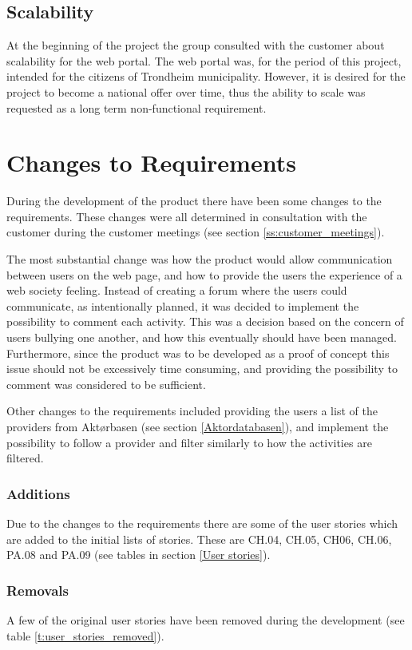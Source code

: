 \subsection{Scalability}
At the beginning of the project the group consulted with the customer about scalability for the web portal. The web portal was, for the period of this project, intended for the citizens of Trondheim municipality. However, it is desired for the project to become a national offer over time, thus the ability to scale was requested as a long term non-functional requirement.


\section{Changes to Requirements}
During the development of the product there have been some changes to the requirements. These changes were all determined in consultation with the customer during the customer meetings (see section \ref{ss:customer_meetings}). 

The most substantial change was how the product would allow communication between users on the web page, and how to provide the users the experience of a web society feeling. Instead of creating a forum where the users could communicate, as intentionally planned, it was decided to implement the possibility to comment each activity. This was a decision based on the concern of users bullying one another, and how this eventually should have been managed. Furthermore, since the product was to be developed as a proof of concept this issue should not be excessively time consuming, and providing the possibility to comment was considered to be sufficient. 

Other changes to the requirements included providing the users a list of the providers from Aktørbasen (see section \ref{Aktordatabasen}), and implement the possibility to follow a provider and filter similarly to how the activities are filtered.  

\subsubsection{Additions}
\label{additions}
Due to the changes to the requirements there are some of the user stories which are added to the initial lists of stories. These are CH.04, CH.05, CH06, CH.06, PA.08 and PA.09 (see tables in section \ref{User stories}).

\subsubsection{Removals}
\label{removals}
A few of the original user stories have been removed during the development (see table \ref{t:user_stories_removed}).

